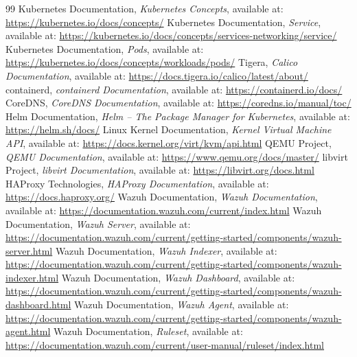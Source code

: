 \begin{thebibliography}{99}
 Kubernetes Documentation, \textit{Kubernetes Concepts}, available at: \url{https://kubernetes.io/docs/concepts/}
 Kubernetes Documentation, \textit{Service}, available at: \url{https://kubernetes.io/docs/concepts/services-networking/service/}
 Kubernetes Documentation, \textit{Pods}, available at: \url{https://kubernetes.io/docs/concepts/workloads/pods/}
 Tigera, \textit{Calico Documentation}, available at: \url{https://docs.tigera.io/calico/latest/about/}
 containerd, \textit{containerd Documentation}, available at: \url{https://containerd.io/docs/}
 CoreDNS, \textit{CoreDNS Documentation}, available at: \url{https://coredns.io/manual/toc/}
 Helm Documentation, \textit{Helm -- The Package Manager for Kubernetes}, available at: \url{https://helm.sh/docs/}
 Linux Kernel Documentation, \textit{Kernel Virtual Machine API}, available at: \url{https://docs.kernel.org/virt/kvm/api.html}
 QEMU Project, \textit{QEMU Documentation}, available at: \url{https://www.qemu.org/docs/master/}
 libvirt Project, \textit{libvirt Documentation}, available at: \url{https://libvirt.org/docs.html}
 HAProxy Technologies, \textit{HAProxy Documentation}, available at: \url{https://docs.haproxy.org/}
 Wazuh Documentation, \textit{Wazuh Documentation}, available at: \url{https://documentation.wazuh.com/current/index.html}
 Wazuh Documentation, \textit{Wazuh Server}, available at: \url{https://documentation.wazuh.com/current/getting-started/components/wazuh-server.html}
 Wazuh Documentation, \textit{Wazuh Indexer}, available at: \url{https://documentation.wazuh.com/current/getting-started/components/wazuh-indexer.html}
 Wazuh Documentation, \textit{Wazuh Dashboard}, available at: \url{https://documentation.wazuh.com/current/getting-started/components/wazuh-dashboard.html}
 Wazuh Documentation, \textit{Wazuh Agent}, available at: \url{https://documentation.wazuh.com/current/getting-started/components/wazuh-agent.html}
 Wazuh Documentation, \textit{Ruleset}, available at: \url{https://documentation.wazuh.com/current/user-manual/ruleset/index.html}

\end{thebibliography}
